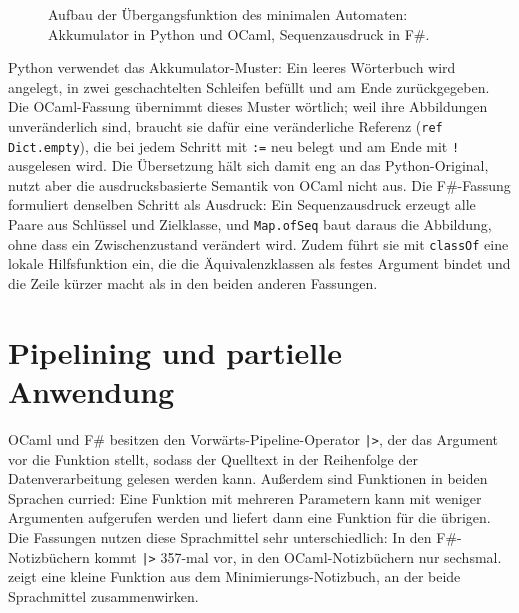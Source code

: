 \begin{figure}[tbp]



\caption{Aufbau der Übergangsfunktion des minimalen Automaten: Akkumulator in Python und OCaml, Sequenzausdruck in F\#.}
\label{fig:minimize_delta}
\end{figure}

Python verwendet das Akkumulator-Muster: Ein leeres Wörterbuch wird angelegt, in zwei geschachtelten Schleifen befüllt und am Ende zurückgegeben.
Die OCaml-Fassung übernimmt dieses Muster wörtlich; weil ihre Abbildungen unveränderlich sind, braucht sie dafür eine veränderliche Referenz (\texttt{ref Dict.empty}), die bei jedem Schritt mit \texttt{:=} neu belegt und am Ende mit \texttt{!} ausgelesen wird.
Die Übersetzung hält sich damit eng an das Python-Original, nutzt aber die ausdrucksbasierte Semantik von OCaml nicht aus.
Die F\#-Fassung formuliert denselben Schritt als Ausdruck: Ein Sequenzausdruck erzeugt alle Paare aus Schlüssel und Zielklasse, und \texttt{Map.ofSeq} baut daraus die Abbildung, ohne dass ein Zwischenzustand verändert wird.
Zudem führt sie mit \texttt{classOf} eine lokale Hilfsfunktion ein, die die Äquivalenzklassen als festes Argument bindet und die Zeile kürzer macht als in den beiden anderen Fassungen.

\section{Pipelining und partielle Anwendung}
\label{sec:pipelining_currying}

OCaml und F\# besitzen den Vorwärts-Pipeline-Operator \texttt{|>}, der das Argument vor die Funktion stellt, sodass der Quelltext in der Reihenfolge der Datenverarbeitung gelesen werden kann.
Außerdem sind Funktionen in beiden Sprachen curried: Eine Funktion mit mehreren Parametern kann mit weniger Argumenten aufgerufen werden und liefert dann eine Funktion für die übrigen.
Die Fassungen nutzen diese Sprachmittel sehr unterschiedlich: In den F\#-Notizbüchern kommt \texttt{|>} 357-mal vor, in den OCaml-Notizbüchern nur sechsmal.
 zeigt eine kleine Funktion aus dem Minimierungs-Notizbuch, an der beide Sprachmittel zusammenwirken.

